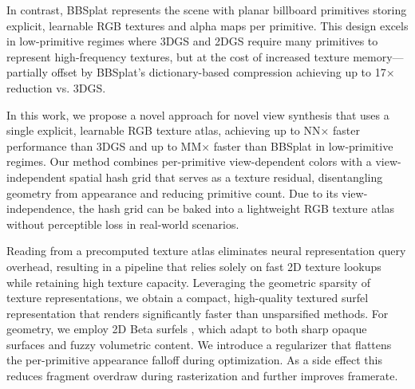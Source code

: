 \documentclass[acmtog,anonymous,review]{acmart}
\begin{document}
In contrast, BBSplat \cite{NN} represents the scene with planar billboard primitives storing explicit, learnable RGB textures and alpha maps per primitive. This design excels in low-primitive regimes where 3DGS and 2DGS require many primitives to represent high-frequency textures, but at the cost of increased texture memory---partially offset by BBSplat's dictionary-based compression achieving up to 17× reduction vs. 3DGS.





In this work, we propose a novel approach for novel view synthesis that uses a single explicit, learnable RGB texture atlas, achieving up to NN× faster performance than 3DGS and up to MM× faster than BBSplat in low-primitive regimes. Our method combines per-primitive view-dependent colors with a view-independent spatial hash grid that serves as a texture residual, disentangling geometry from appearance and reducing primitive count. Due to its view-independence, the hash grid can be baked into a lightweight RGB texture atlas without perceptible loss in real-world scenarios. 

Reading from a precomputed texture atlas eliminates neural representation query overhead, resulting in a pipeline that relies solely on fast 2D texture lookups while retaining high texture capacity. Leveraging the geometric sparsity of texture representations, we obtain a compact, high-quality textured surfel representation that renders significantly faster than unsparsified methods. For geometry, we employ 2D Beta surfels \cite{NN}, which adapt to both sharp opaque surfaces and fuzzy volumetric content. We introduce a regularizer that flattens the per-primitive appearance falloff during optimization. As a side effect this reduces fragment overdraw during rasterization and further improves framerate.
\end{document}
